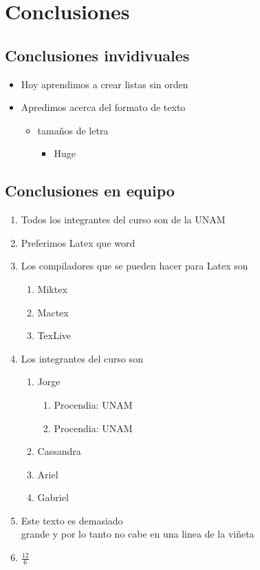 \documentclass{article}
\begin{document}

\section{Conclusiones}

\subsection{Conclusiones invidivuales}

\begin{itemize}
    \item Hoy aprendimos a crear listas sin orden
    \item Apredimos acerca del formato de texto
    \begin{itemize}
        \item tamaños de letra
        \begin{itemize}
            \item Huge
        \end{itemize}
    \end{itemize}
    
    
\end{itemize}
\newpage
\subsection{Conclusiones en equipo}
    \renewcommand{\labelenumii}{\Roman{enumii}}
    \renewcommand{\labelenumiii}{\Alph{enumiii}}
    \begin{enumerate}
        \item Todos los integrantes del curso son de la UNAM
        \item Preferimos Latex que word
        \item Los compiladores que se pueden hacer para Latex son
        \begin{enumerate}
            \item Miktex
            \item Mactex
            \item TexLive
        \end{enumerate}
        \item Los integrantes del curso son
        \begin{enumerate}
            \item Jorge
            \begin{enumerate}
                \item Procendia: UNAM
                \item Procendia: UNAM
            \end{enumerate}
            \item Cassandra
            \item Ariel
            \item Gabriel
        \end{enumerate}
        \item Este texto es demasiado \\grande y por lo tanto no cabe en una linea de la viñeta
        \item $\frac{12}{6} $
    \end{enumerate}
    
\end{document}
